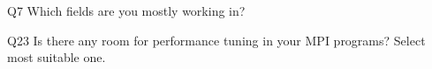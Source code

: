 \begin{description}%
\item{Q7} Which fields are you mostly working in?%
\item{Q23} Is there any room for performance tuning in your MPI programs? Select most suitable one.%
\end{description}%
